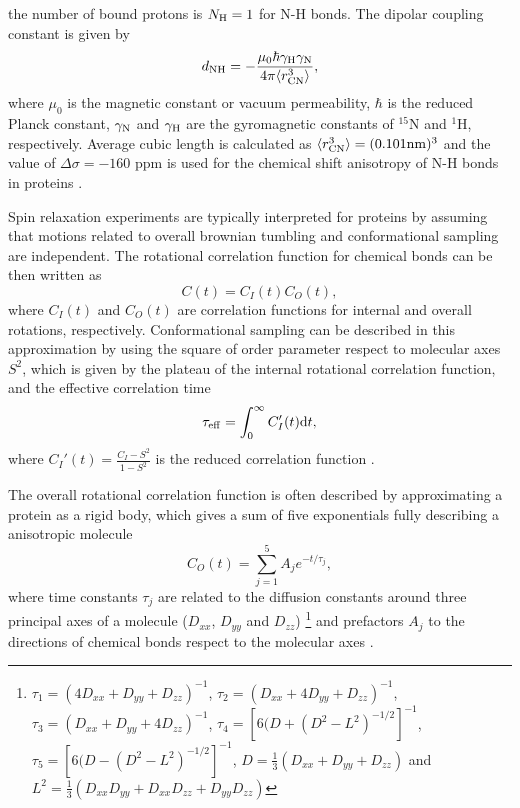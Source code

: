 \documentclass[pre,aps,floatfix,authordate1-4,twocolumn]{revtex4-1}
\begin{document}
the number of bound protons is $N_{\rm{H}}=1$ for N-H bonds.
The dipolar coupling constant is given by
\begin{equation}
d_{\rm{NH}}=-\frac{\mu_0\hbar\gamma_{\rm{H}}\gamma_{\rm{N}}}{4\pi\langle r_{\rm{CN}}^3\rangle},\nonumber
\end{equation}
where $\mu_0$ is the magnetic constant or vacuum permeability, $\hbar$ is the reduced Planck constant,
$\gamma_{\rm{N}}$ and $\gamma_{\rm{H}}$ are the gyromagnetic constants of $^{15}$N and $^1$H, respectively.
Average cubic length is calculated as $\langle r_{\rm{CN}}^3\rangle = (0.101{\rm nm})^3$ and the 
value of $\Delta \sigma = -160$ ppm is used for the chemical shift anisotropy of N-H bonds in 
proteins \cite{kay89,hiyama88}.

Spin relaxation experiments are typically interpreted for proteins by
assuming that motions related to overall brownian tumbling 
and conformational sampling are independent.
The rotational correlation function for chemical bonds can be then written
as  \cite{wennerstrom79,Lipari82,jarymowycz06,korzhnev01,halle09}
\begin{equation}\label{CORRFsep}
  C(t)=C_I(t)C_O(t),
\end{equation}
where $C_I(t)$ and $C_O(t)$ are correlation functions for internal and overall
rotations, respectively. Conformational sampling can be described
in this approximation by using the square of order parameter respect to 
molecular axes $S^2$, which is given by the plateau of the internal rotational 
correlation function, and the effective correlation time 
\begin{equation}\label{effCT}
  \tau_{\rm eff}=\int_0^\infty C_I'(t) \mathrm{d}t,
\end{equation}
where $C_I'(t)=\frac{C_I-S^2}{1-S^2}$ is the reduced correlation function \cite{Lipari82}.

The overall rotational correlation function is often described
by approximating a protein as a rigid body, which gives 
a sum of five exponentials fully describing a anisotropic molecule \cite{woessner62,korzhnev01}
\begin{equation}\label{CORRFanisot}
  C_O(t)=\sum_{j=1}^5 A_j e^{-t/\tau_j},
\end{equation}
where time constants $\tau_j$ are related 
to the diffusion constants around
three principal axes of a molecule
($D_{xx}$, $D_{yy}$ and $D_{zz}$)  
\footnote{
$\tau_1=(4D_{xx}+D_{yy}+D_{zz})^{-1}$,
$\tau_2=(D_{xx}+4D_{yy}+D_{zz})^{-1}$,
$\tau_3=(D_{xx}+D_{yy}+4D_{zz})^{-1}$,
$\tau_4=[6(D+(D^2-L^2)^{-1/2}]^{-1}$,
$\tau_5=[6(D-(D^2-L^2)^{-1/2}]^{-1}$,
$D=\frac{1}{3}(D_{xx}+D_{yy}+D_{zz})$ and 
$L^2=\frac{1}{3}(D_{xx}D_{yy}+D_{xx}D_{zz}+D_{yy}D_{zz})$}
and prefactors $A_j$ to the directions of chemical bonds 
respect to the molecular axes \cite{woessner62,luginbuhl97}.
\end{document}
